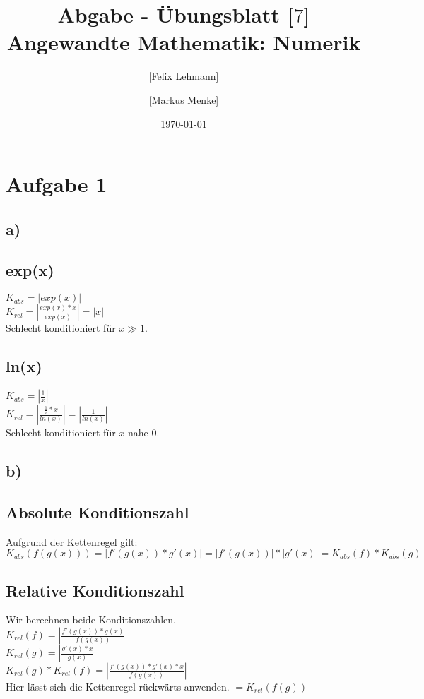 \documentclass[10pt,a4paper]{article}
\begin{document}
\title{Abgabe - Übungsblatt [$7$]\\
\small{Angewandte Mathematik: Numerik}}
\author{ [Felix Lehmann] \and [Markus Menke]}
\date{\today}
\maketitle

\section*{Aufgabe 1}
\subsection*{a)}
\subsection*{exp(x)}
$K_{abs} = |exp(x)|$\\
$K_{rel} = |\frac{exp(x) * x}{exp(x)}| = |x| $\\
Schlecht konditioniert für $x \gg 1$.\\

\subsection*{ln(x)}
$K_{abs} = |\frac{1}{x}|$\\
$K_{rel} = |\frac{\frac{1}{x} * x}{ln(x)}| = |\frac{1}{ln(x)}| $\\
Schlecht konditioniert für $x$ nahe 0.\\

\subsection*{b)}
\subsection*{Absolute Konditionszahl}
Aufgrund der Kettenregel gilt:\\
$K_{abs}(f(g(x))) = |f'(g(x)) * g'(x)| = |f'(g(x))| * |g'(x)| = K_{abs}(f) * K_{abs}(g)$\\

\subsection*{Relative Konditionszahl}
Wir berechnen beide Konditionszahlen.\\
$K_{rel}(f) = |\frac{f'(g(x)) * g(x)}{f(g(x))}|$\\
$K_{rel}(g) = |\frac{g'(x)*x}{g(x)}|$\\
$K_{rel}(g) * K_{rel}(f) = |\frac{f'(g(x))*g'(x)*x}{f(g(x))}|$\\
Hier lässt sich die Kettenregel rückwärts anwenden.
$= K_{rel}(f(g))$
\end{document}
